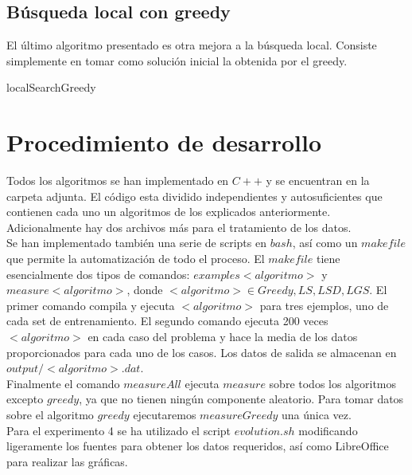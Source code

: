 \documentclass[11pt,a4paper]{article}
\begin{document}
	\subsection{Búsqueda local con greedy}
	
	El último algoritmo presentado es otra mejora a la búsqueda local. Consiste simplemente en tomar como solución inicial la obtenida por el greedy. 
	
	\begin{algorithm}
	\caption{localSearchGreedy}
	\end{algorithm}


	\section{Procedimiento de desarrollo}
	
	Todos los algoritmos se han implementado en $C++$ y se encuentran en la carpeta adjunta. El código esta dividido independientes y autosuficientes que contienen cada uno un algoritmos de los explicados anteriormente. Adicionalmente hay dos archivos más para el tratamiento de los datos. \\
	
	Se han implementado también una serie de scripts en $bash$, así como un $makefile$ que permite la automatización de todo el proceso. El $makefile$ tiene esencialmente dos tipos de comandos: $examples<algoritmo>$ y $measure<algoritmo>$, donde $<algoritmo> \in {Greedy, LS, LSD, LGS}$. El primer comando compila y ejecuta $<algoritmo>$ para tres ejemplos, uno de cada set de entrenamiento. El segundo comando ejecuta 200 veces $<algoritmo>$ en cada caso del problema y hace la media de los datos proporcionados para cada uno de los casos. Los datos de salida se almacenan en $output/<algoritmo>.dat$. \\
	
	Finalmente el comando $measureAll$ ejecuta $measure$ sobre todos los algoritmos excepto $greedy$, ya que no tienen ningún componente aleatorio. Para tomar datos sobre el algoritmo $greedy$ ejecutaremos $measureGreedy$ una única vez. \\
	
	Para el experimento 4 se ha utilizado el script $evolution.sh$ modificando ligeramente los fuentes para obtener los datos requeridos, así como LibreOffice para realizar las gráficas. \\
	
\end{document}
